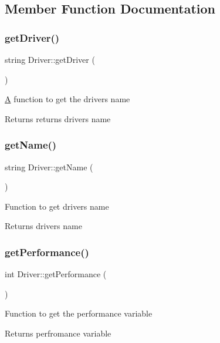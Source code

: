 \subsection{Member Function Documentation}
\mbox{\label{classDriver_abd055f2390a62d8347115e6616ce5aa3}} 
\subsubsection{\texorpdfstring{get\+Driver()}{getDriver()}}
{\footnotesize\ttfamily string Driver\+::get\+Driver (\begin{DoxyParamCaption}{ }\end{DoxyParamCaption})}

\hyperlink{classA}{A} function to get the drivers name \begin{DoxyReturn}{Returns}
returns drivers name 
\end{DoxyReturn}
\mbox{\label{classDriver_ae85810c10f8aa5f9db23633b5c86edcf}} 
\subsubsection{\texorpdfstring{get\+Name()}{getName()}}
{\footnotesize\ttfamily string Driver\+::get\+Name (\begin{DoxyParamCaption}{ }\end{DoxyParamCaption})}

Function to get drivers name \begin{DoxyReturn}{Returns}
drivers name 
\end{DoxyReturn}
\mbox{\label{classDriver_a96ea452112b25946d7a68005e75bd125}} 
\subsubsection{\texorpdfstring{get\+Performance()}{getPerformance()}}
{\footnotesize\ttfamily int Driver\+::get\+Performance (\begin{DoxyParamCaption}{ }\end{DoxyParamCaption})}

Function to get the performance variable \begin{DoxyReturn}{Returns}
perfromance variable 
\end{DoxyReturn}
\mbox{\label{classDriver_a7d527bc5a262fcba16f239103969bbc3}} 
